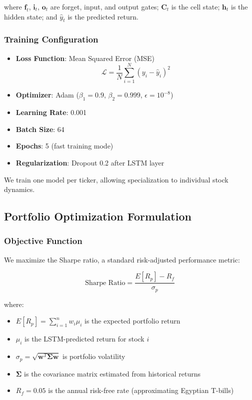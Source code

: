 \documentclass[conference]{IEEEtran}
\begin{document}
where $\mathbf{f}_t$, $\mathbf{i}_t$, $\mathbf{o}_t$ are forget, input, and output gates; $\mathbf{C}_t$ is the cell state; $\mathbf{h}_t$ is the hidden state; and $\hat{y}_t$ is the predicted return.

\subsubsection{Training Configuration}
\begin{itemize}
\item \textbf{Loss Function}: Mean Squared Error (MSE)
\begin{equation}
\mathcal{L} = \frac{1}{N} \sum_{i=1}^{N} (y_i - \hat{y}_i)^2
\end{equation}
\item \textbf{Optimizer}: Adam ($\beta_1=0.9$, $\beta_2=0.999$, $\epsilon=10^{-8}$)
\item \textbf{Learning Rate}: 0.001
\item \textbf{Batch Size}: 64
\item \textbf{Epochs}: 5 (fast training mode)
\item \textbf{Regularization}: Dropout 0.2 after LSTM layer
\end{itemize}

We train one model per ticker, allowing specialization to individual stock dynamics.

\subsection{Portfolio Optimization Formulation}

\subsubsection{Objective Function}
We maximize the Sharpe ratio, a standard risk-adjusted performance metric:

\begin{equation}
\text{Sharpe Ratio} = \frac{E[R_p] - R_f}{\sigma_p}
\end{equation}

where:
\begin{itemize}
\item $E[R_p] = \sum_{i=1}^{n} w_i \mu_i$ is the expected portfolio return
\item $\mu_i$ is the LSTM-predicted return for stock $i$
\item $\sigma_p = \sqrt{\mathbf{w}^T \boldsymbol{\Sigma} \mathbf{w}}$ is portfolio volatility
\item $\boldsymbol{\Sigma}$ is the covariance matrix estimated from historical returns
\item $R_f = 0.05$ is the annual risk-free rate (approximating Egyptian T-bills)
\end{itemize}
\end{document}
